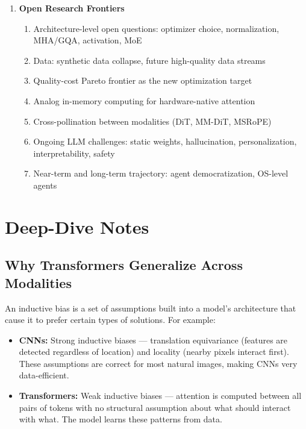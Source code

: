 \documentclass[11pt, a4paper]{article}
\begin{document}
\begin{enumerate}[label=\textbf{\arabic*.}, leftmargin=2em]
  \item \textbf{Open Research Frontiers}
    \begin{enumerate}[label=\arabic{enumi}.\arabic*]
      \item Architecture-level open questions: optimizer choice, normalization, MHA/GQA, activation, MoE
      \item Data: synthetic data collapse, future high-quality data streams
      \item Quality-cost Pareto frontier as the new optimization target
      \item Analog in-memory computing for hardware-native attention
      \item Cross-pollination between modalities (DiT, MM-DiT, MSRoPE)
      \item Ongoing LLM challenges: static weights, hallucination, personalization, interpretability, safety
      \item Near-term and long-term trajectory: agent democratization, OS-level agents
    \end{enumerate}
\end{enumerate}

\newpage
\section{Deep-Dive Notes}

\subsection{Why Transformers Generalize Across Modalities}

\begin{defbox}
An inductive bias is a set of assumptions built into a model's architecture that cause it to prefer certain types of solutions. For example:
\begin{itemize}[leftmargin=1.5em]
  \item \textbf{CNNs:} Strong inductive biases --- translation equivariance (features are detected regardless of location) and locality (nearby pixels interact first). These assumptions are correct for most natural images, making CNNs very data-efficient.
  \item \textbf{Transformers:} Weak inductive biases --- attention is computed between all pairs of tokens with no structural assumption about what should interact with what. The model learns these patterns from data.
\end{itemize}
\end{defbox}
\end{document}
